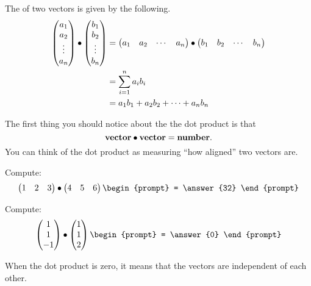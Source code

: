 \documentclass{ximera}
\begin{document}
 \begin{definition}
  The  of two vectors is given by the following.
  \begin{align*}
  \begin{pmatrix}
    a_1\\
    a_2\\
    \vdots\\
    a_n
  \end{pmatrix}
  \bullet
  \begin{pmatrix}
    b_1\\
    b_2\\
    \vdots\\
    b_n
  \end{pmatrix}
  &=\begin{pmatrix} a_1 & a_2 & \cdots & a_n\end{pmatrix}\bullet\begin{pmatrix} b_1 & b_2 & \cdots & b_n\end{pmatrix}\\
  &= \sum_{i=1}^n a_ib_i\\
  &= a_1b_1 + a_2b_2 +\dots+a_nb_n
  \end{align*}
\end{definition}

The first thing you should notice about the the dot product is that
\[
\mathbf{vector}\bullet \mathbf{vector} = \mathbf{number}.
\]
You can think of the dot product as measuring ``how aligned'' two vectors are.
\begin{question}
  Compute:
  \[
  \begin{pmatrix}1 & 2 & 3\end{pmatrix}\dotp\begin{pmatrix}4 & 5 & 6\end{pmatrix}
  \begin{prompt}
    = \answer{32}
  \end{prompt}
  \]
\end{question}

\begin{question}
  Compute:
  \[
  \begin{pmatrix}1\\1\\-1\end{pmatrix}\dotp\begin{pmatrix}1\\1\\2\end{pmatrix}
  \begin{prompt}
    = \answer{0}
  \end{prompt}
  \]
\end{question}
When the dot product is zero, it means that the vectors are independent of each other.
\end{document}
